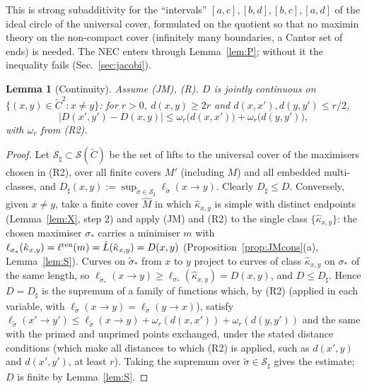 \documentclass[aps,prd,onecolumn,superscriptaddress,nofootinbib,amsmath,amssymb,11pt]{revtex4-2}
\newtheorem{lemma}[theorem]{Lemma}
\theoremstyle{definition}
\begin{document}
This is strong subadditivity for the ``intervals'' $[a,c],[b,d],[b,c],[a,d]$ of the ideal circle of the universal cover,
formulated on the quotient so that no maximin theory on the non-compact cover (infinitely many boundaries, a Cantor set of
ends) is needed. The NEC enters through Lemma~\ref{lem:P}; without it the inequality fails (Sec.~\ref{sec:jacobi}).

\begin{lemma}[Continuity]\label{lem:Ccont}
Assume (JM), (R). $D$ is jointly continuous on $\{(x,y)\in\tilde C^2:x\ne y\}$: for $r>0$, $d(x,y)\ge2r$ and
$d(x,x'),d(y,y')\le r/2$,
\[
|D(x',y')-D(x,y)|\le\omega_r\big(d(x,x')\big)+\omega_r\big(d(y,y')\big),
\]
with $\omega_r$ from (R2).
\end{lemma}

\begin{proof}
Let $\mathcal S_\sharp\subset\mathcal S(\tilde C)$ be the set of lifts to the universal cover of the maximisers chosen in (R2), over all
finite covers $M'$ (including $M$) and all embedded multi-classes, and $D_\sharp(x,y):=\sup_{\tilde\sigma\in\mathcal S_\sharp}\ell_{\tilde\sigma}(x\to y)$.
Clearly $D_\sharp\le D$. Conversely, given $x\ne y$, take a finite cover $\widehat M$ in which $\hat\kappa_{x,y}$ is simple with distinct
endpoints (Lemma~\ref{lem:X}, step 2) and apply (JM) and (R2) to the single class $\{\hat\kappa_{x,y}\}$: the chosen maximiser $\sigma_*$ carries
a minimiser $m$ with $\ell_{\sigma_*}(\hat\kappa_{x,y})=\ell^{\rm ren}(m)=\hat L(\hat\kappa_{x,y})=D(x,y)$ (Proposition~\ref{prop:JMcons}(a),
Lemma~\ref{lem:S}). Curves on $\tilde\sigma_*$ from $x$ to $y$ project to curves of class $\hat\kappa_{x,y}$ on $\sigma_*$ of the same length, so
$\ell_{\tilde\sigma_*}(x\to y)\ge\ell_{\sigma_*}(\hat\kappa_{x,y})=D(x,y)$, and $D\le D_\sharp$. Hence $D=D_\sharp$ is the supremum of a family of
functions which, by (R2) (applied in each variable, with $\ell_{\tilde\sigma}(x\to y)=\ell_{\tilde\sigma}(y\to x)$), satisfy
$\ell_{\tilde\sigma}(x'\to y')\le\ell_{\tilde\sigma}(x\to y)+\omega_r(d(x,x'))+\omega_r(d(y,y'))$ and the same with the primed and unprimed
points exchanged, under the stated distance conditions (which make all distances to which (R2) is applied, such as $d(x',y)$ and $d(x',y')$,
at least $r$). Taking the
supremum over $\tilde\sigma\in\mathcal S_\sharp$ gives the estimate; $D$ is finite by Lemma~\ref{lem:S}.
\end{proof}
\end{document}
